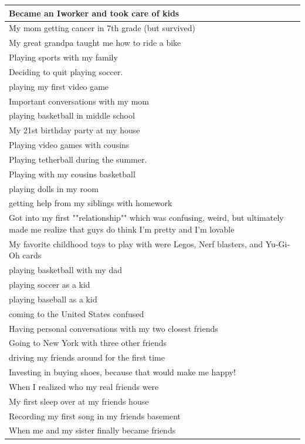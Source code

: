 \documentclass[
  .7em,
  letterpaper,
  DIV=11,
  numbers=noendperiod]{scrartcl}
\begin{document}
\begin{table}
\begin{tabular}{l}
\hline
Became an Iworker and took care of kids\\
\hline
My mom getting cancer in 7th grade (but survived)\\
\hline
My great grandpa taught me how to ride a bike\\
\hline
Playing sports with my family\\
\hline
Deciding to quit playing soccer.\\
\hline
playing my first video game\\
\hline
Important conversations with my mom\\
\hline
playing basketball in middle school\\
\hline
My 21st birthday party at my house\\
\hline
Playing video games with cousins\\
\hline
Playing tetherball during the summer.\\
\hline
Playing with my cousins basketball\\
\hline
playing dolls in my room\\
\hline
getting help from my siblings with homework\\
\hline
Got into my first ""relationship"" which was confusing, weird, but ultimately made me realize that guys do think I'm pretty and I'm lovable\\
\hline
My favorite childhood toys to play with were Legos, Nerf blasters, and  Yu-Gi-Oh cards\\
\hline
playing basketball with my dad\\
\hline
playing soccer as a kid\\
\hline
playing baseball as a kid\\
\hline
coming to the United States confused\\
\hline
Having personal conversations with my two closest friends\\
\hline
Going to New York with three other friends\\
\hline
driving my friends around for the first time\\
\hline
Investing in buying shoes, because that would make me happy!\\
\hline
When I realized who my real friends were\\
\hline
My first sleep over at my friends house\\
\hline
Recording my first song in my friends basement\\
\hline
When me and my sister finally became friends\\

\end{tabular}
\end{table}
\end{document}
